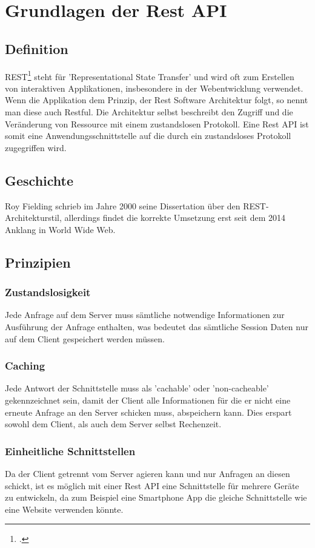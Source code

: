\chapter{Grundlagen der Rest API}
\bauer
\section{Definition} 
REST\footcite{rest} steht für 'Representational State Transfer' und wird oft zum Erstellen von interaktiven Applikationen, insbesondere in der Webentwicklung verwendet. 
Wenn die Applikation dem Prinzip, der Rest Software Architektur folgt, so nennt man diese auch Restful. Die Architektur selbst beschreibt den Zugriff und die Veränderung von Ressource mit einem zustandslosen Protokoll. Eine Rest API ist somit eine Anwendungsschnittstelle auf die durch ein zustandsloses Protokoll zugegriffen wird.			
\section{Geschichte}
Roy Fielding schrieb im Jahre 2000 seine Dissertation über den REST-Architekturstil, allerdings findet die korrekte Umsetzung erst seit dem 2014 Anklang in World Wide Web.		 	
\section{Prinzipien}		 				 	
\subsection{Zustandslosigkeit}
Jede Anfrage auf dem Server muss sämtliche notwendige Informationen zur Ausführung der Anfrage enthalten, was bedeutet das sämtliche Session Daten nur auf dem Client gespeichert werden müssen.		 	
\subsection{Caching}
Jede Antwort der Schnittstelle muss als 'cachable' oder 'non-cacheable' gekennzeichnet sein, damit der Client alle Informationen für die er nicht eine erneute Anfrage an den Server schicken muss, abspeichern kann. Dies erspart sowohl dem Client, als auch dem Server selbst Rechenzeit.		 	
\subsection{Einheitliche Schnittstellen}
Da der Client getrennt vom Server agieren kann und nur Anfragen an diesen schickt, ist es möglich mit einer Rest API eine Schnittstelle für mehrere Geräte zu entwickeln, da zum Beispiel eine Smartphone App die gleiche Schnittstelle wie eine Website verwenden könnte.		 	
